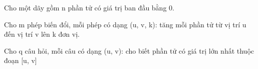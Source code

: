 Cho một dãy gồm n phần tử có giá trị ban đầu bằng 0.  

   Cho m phép biến đổi, mỗi phép có dạng (u, v, k): tăng mỗi phần tử từ vị trí u đến vị trí v lên k đơn vị.  

   Cho q câu hỏi, mỗi câu có dạng (u, v): cho biết phần tử có giá trị lớn nhất thuộc đoạn [u, v]